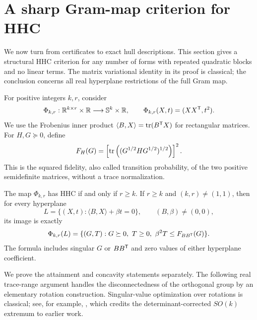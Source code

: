 \section{A sharp Gram-map criterion for HHC}
\label{sec:gram-hyperplanes}

We now turn from certificates to exact hull descriptions. This section
gives a structural HHC criterion for any number of forms with repeated
quadratic blocks and no linear terms. The matrix variational identity in
its proof is classical; the conclusion concerns all real hyperplane
restrictions of the full Gram map.

For positive integers $k,r$, consider
\[
 \Phi_{k,r}:\mathbb R^{k\times r}\times\mathbb R\longrightarrow\mathbb S^k\times\mathbb R,
 \qquad \Phi_{k,r}(X,t)=(XX^{\mathsf T},t^2).
\]
We use the Frobenius inner product
$\langle B,X\rangle=\operatorname{tr}(B^{\mathsf T} X)$ for rectangular matrices.
For $H,G\succeq0$, define
\begin{equation}\label{eq:squared-fidelity}
 F_H(G)=\left[\operatorname{tr}\left((G^{1/2}HG^{1/2})^{1/2}\right)\right]^2.
\end{equation}
This is the squared fidelity, also called transition probability, of
the two positive semidefinite matrices, without a trace normalization.

\begin{theorem}\label{thm:gram-hhc}
The map $\Phi_{k,r}$ has HHC if and only if $r\geq k$.
If $r\geq k$ and $(k,r)\ne(1,1)$, then for every hyperplane
\[
 L=\{(X,t):\langle B,X\rangle+\beta t=0\},
 \qquad (B,\beta)\ne(0,0),
\]
its image is exactly
\begin{equation}\label{eq:gram-hyperplane-image}
 \Phi_{k,r}(L)=
 \{(G,T):G\succeq0,\ T\geq0,\ \beta^2T\leq F_{BB^{\mathsf T}}(G)\}.
\end{equation}
The formula includes singular $G$ or $BB^{\mathsf T}$ and zero values of
either hyperplane coefficient.
\end{theorem}

We prove the attainment and concavity statements separately. The
following real trace-range argument handles the disconnectedness of the
orthogonal group by an elementary rotation construction. Singular-value
optimization over rotations is classical; see, for example,
\citet[Lemma~1]{RamachandranShuWang2025}, which credits the
determinant-corrected $SO(k)$ extremum to earlier work.

